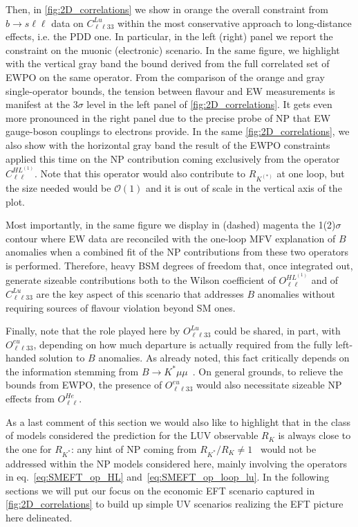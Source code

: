 Then, in \autoref{fig:2D_correlations} we show in orange the overall constraint from $b \to s \ell \ell$ data on $C^{Lu}_{\ell \ell 3 3}$ within the most conservative approach to long-distance effects, i.e. the PDD one. In particular, in the left (right) panel we report the constraint on the muonic (electronic) scenario. In the same figure, we highlight with the vertical gray band the bound derived from the full correlated set of EWPO on the same operator. From the comparison of the orange and gray single-operator bounds, the tension between flavour and EW measurements is manifest at the 3$\sigma$ level in the left panel of \autoref{fig:2D_correlations}. It gets even more pronounced in the right panel due to the precise probe of NP that EW gauge-boson couplings to electrons provide. In the same \autoref{fig:2D_correlations}, we also show with the horizontal gray band the result of the EWPO constraints applied this time on the NP contribution coming exclusively from the operator $C^{HL^{(1)}}_{\ell \ell}$. Note that this operator would also contribute to $R_{K^{(*)}}$ at one loop, but the size needed would be $\mathcal{O}(1)$ and it is out of scale in the vertical axis of the plot.

Most importantly, in the same figure we display in (dashed) magenta the 1(2)$\sigma$ contour where EW data are reconciled with the one-loop MFV explanation of $B$ anomalies when a combined fit of the NP contributions from these two operators is performed. {Therefore, heavy BSM degrees of freedom that, once integrated out, generate sizeable contributions both  to the Wilson coefficient of $O^{HL^{(1)}}_{\ell \ell}$ and of $C^{Lu}_{\ell \ell33}$ are the key aspect of this scenario that addresses $B$ anomalies without requiring sources of flavour violation beyond SM ones.}

Finally, note that the role played here by $O^{Lu}_{\ell \ell 3 3}$ could be shared, in part, with $O^{eu}_{\ell \ell 3 3}$, depending on how much departure is actually required from the fully left-handed solution to $B$ anomalies. As already noted, this fact critically depends on the information stemming from $B \to K^{*} \mu \mu$~\cite{Ciuchini:2019usw}. On general grounds, to relieve the bounds from EWPO, the presence of $O^{eu}_{\ell \ell 3 3}$ would also necessitate sizeable NP effects from $O^{He}_{\ell \ell}$. 

As a last comment of this section we would also like to highlight that in the class of models considered the prediction for the LUV observable $R_{K}$ is always close to the one for $R_{K^{*}}$: any hint of NP coming from $R_{K^{*}}/R_{K} \neq 1$~\cite{Hiller:2014ula,Hurth:2014vma,Hiller:2014yaa,Hiller:2017bzc} would not be addressed within the NP models considered here, mainly involving the operators in eq.~\eqref{eq:SMEFT_op_HL} and~\eqref{eq:SMEFT_op_loop_lu}. In the following sections we will put our focus on the economic EFT scenario captured in \autoref{fig:2D_correlations} to build up simple UV scenarios realizing the EFT picture here delineated.

